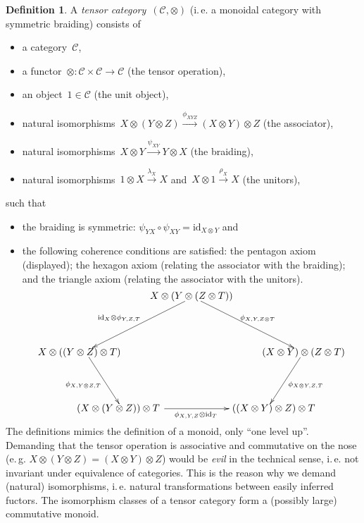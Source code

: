 \documentclass[a4paper,english,12pt]{scrartcl}
\theoremstyle{definition}
\newtheorem{defn}{Definition}[section]
\theoremstyle{plain}
\theoremstyle{remark}
\newcommand{\C}{\mathcal{C}}
\newcommand{\id}{\mathrm{id}}
\newcommand{\xra}[1]{\xrightarrow{#1}}
\renewcommand{\_}{\mathpunct{.}\,}
\newcommand{\?}{\,{:}\,}
\begin{document}
\begin{defn}A \emph{tensor category}~$(\C,\otimes)$ (i.\,e. a monoidal category with
symmetric braiding) consists of
\begin{itemize}
\item a category~$\C$,
\item a functor~${\otimes} : \C \times \C \to \C$ (the tensor operation),
\item an object~$1 \in \C$ (the unit object),
\item natural isomorphisms~$X \otimes (Y \otimes Z) \xra{\phi_{XYZ}} (X \otimes
Y) \otimes Z$ (the associator),
\item natural isomorphisms~$X \otimes Y \xra{\psi_{XY}} Y \otimes X$ (the
braiding),
\item natural isomorphisms~$1 \otimes X \xra{\lambda_X} X$ and~$X \otimes 1
\xra{\rho_X} X$ (the unitors),
\end{itemize}
such that
\begin{itemize}
\item the braiding is symmetric: $\psi_{YX} \circ \psi_{XY} = \id_{X \otimes
Y}$ and
\item the following coherence conditions are satisfied: the pentagon axiom
(displayed); the hexagon axiom (relating the associator with the braiding); and
the triangle axiom (relating the associator with the unitors).
\[ \xy
(0,20)*{X \otimes (Y \otimes (Z \otimes T))}="1"; 
(40,0)*{(X \otimes Y) \otimes (Z \otimes T)}="2"; 
(27,-20)*{\quad\ ((X \otimes Y) \otimes Z) \otimes T}="3"; 
(-27,-20)*{(X \otimes (Y \otimes Z)) \otimes T\!\!\!}="4"; 
(-40,0)*{X \otimes ((Y \otimes Z) \otimes T)}="5"; 
{\ar^{\phi_{X,Y,Z \otimes T}} "1";"2"} 
{\ar^{\phi_{X\otimes Y,Z,T}} "2";"3"} 
{\ar_{\id_X \otimes \phi_{Y,Z,T}\quad} "1";"5"} 
{\ar_{\phi_{X,Y\otimes Z,T}} "5";"4"} 
{\ar_{\!\!\!\!\!\!\!\!\phi_{X,Y,Z} \otimes \id_T} "4";"3"} 
\endxy \]
\end{itemize}
\end{defn}

The definitions mimics the definition of a monoid, only ``one level up''.
Demanding that the tensor operation is associative and commutative on the nose
(e.\,g. $X \otimes (Y \otimes Z) = (X \otimes Y) \otimes Z$) would be
\emph{evil} in the technical sense, i.\,e. not invariant under equivalence of
categories. This is the reason why we demand (natural) isomorphisms, i.\,e.
natural transformations between easily inferred fuctors.
The isomorphism classes of a tensor category form a (possibly large) commutative monoid.
\end{document}
